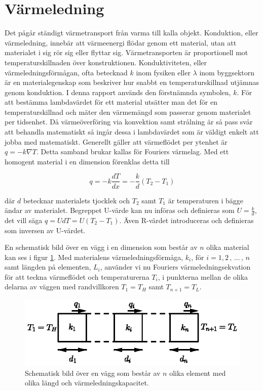 \section{Värmeledning}\label{sec:heatconduction}

Det pågår ständigt värmetransport från varma till kalla objekt. Konduktion, eller värmeledning, innebär att värmeenergi flödar genom ett material, utan att materialet i sig rör sig eller flyttar sig. Värmetransporten är proportionell mot temperaturskillnaden över konstruktionen. Konduktiviteten, eller värmeledningsförmågan, ofta betecknad $k$ inom fysiken eller $\lambda$ inom byggsektorn är en materialegenskap som beskriver hur snabbt en temperaturskillnad utjämnas genom konduktion. I denna rapport används den förstnämnda symbolen, $k$. För att bestämma lambdavärdet för ett material utsätter man det för en temperaturskillnad och mäter den värmemängd som passerar genom materialet per tidsenhet. Då värmeöverföring via konvektion samt strålning är så pass svår att behandla matematiskt så ingår dessa i lambdavärdet som är väldigt enkelt att jobba med matematiskt. Generellt gäller att värmeflödet per ytenhet är $q = - k \nabla T$. Detta samband brukar kallas för Fouriers värmelag. Med ett homogent material i en dimension förenklas detta till

\begin{equation}\label{eq:conduction:fourier}\boxed{ \; \; \;
q = -k \frac{dT}{dx} = -\frac{k}{d}\left( T_2-T_1\right)
\; \; \; }
\end{equation}

där $d$ betecknar materialets tjocklek och $T_2$ samt $T_1$ är temperaturen i bägge ändar av materialet. Begreppet U-värde kan nu införas och definieras som $U = \frac{k}{d}$, det vill säga $q = UdT = U\left( T_2-T_1 \right)$. Även R-värdet introduceras och definieras som inversen av U-värdet.

En schematisk bild över en vägg i en dimension som består av $n$ olika material kan ses i figur \ref{fig:staticwallmethod:wall}. Med materialens värmeledningsförmåga, $k_i$, för $i=1,2\,,\,...\,,\,n$ samt längden på elementen, $L_i$, använder vi nu Fouriers värmeledningsekvation för att teckna värmeflödet och temperaturerna $T_i$, i punkterna mellan de olika delarna av väggen med randvillkoren $T_1 = T_H$ samt $T_{n+1} = T_L$.

\begin{figure}[hpbt]
\centering
\includegraphics{images/wall.eps}
\caption{Schematisk bild över en vägg som består av $n$ olika element med olika
längd och värmeledningskapacitet.}\label{fig:staticwallmethod:wall}
\end{figure}

